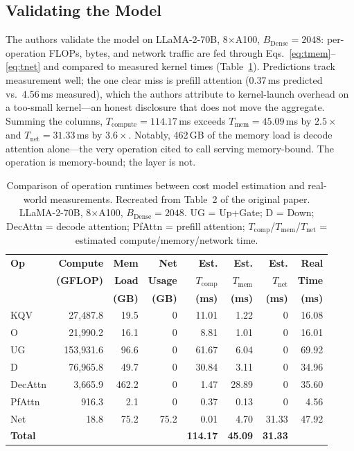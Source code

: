 \documentclass[manuscript,review]{acmart}
\newcommand{\Bdense}{B_{\mathrm{Dense}}}
\begin{document}
\subsection{Validating the Model}
\label{sec:validation}

The authors validate the model on LLaMA-2-70B, 8$\times$A100, $\Bdense = 2048$: per-operation FLOPs, bytes, 
and network traffic are fed through Eqs.~\ref{eq:tmem}--\ref{eq:tnet} and compared to measured kernel times 
(Table~\ref{tab:validation}). Predictions track measurement well; the one clear miss is prefill attention 
(0.37\,ms predicted vs.\ 4.56\,ms measured), which the authors attribute to kernel-launch overhead on a 
too-small kernel---an honest disclosure that does not move the aggregate. Summing the columns, 
$T_{\mathrm{compute}} = 114.17$\,ms exceeds $T_{\mathrm{mem}} = 45.09$\,ms by $2.5\times$ and $T_{\mathrm{net}} = 31.33$\,ms by 
$3.6\times$. Notably, 462\,GB of the memory load is decode attention alone---the very operation cited to call 
serving memory-bound. The operation is memory-bound; the layer is not.
\begin{table}[t]
\centering
\caption{Comparison of operation runtimes between cost model estimation and real-world measurements. 
Recreated from Table~2 of the original paper. LLaMA-2-70B, 8$\times$A100, $\Bdense = 2048$. UG = Up+Gate; 
D = Down; DecAttn = decode attention; PfAttn = prefill attention; $T_{\mathrm{comp}}$/$T_{\mathrm{mem}}$/$T_{\mathrm{net}}$ = estimated compute/memory/network time.}
\label{tab:validation}
\small
\setlength{\tabcolsep}{4pt}
\begin{tabular}{lrrrrrrr}
\toprule
\textbf{Op} & \textbf{Compute} & \textbf{Mem} & \textbf{Net} &
\textbf{Est.} & \textbf{Est.} & \textbf{Est.} & \textbf{Real} \\
 & \textbf{(GFLOP)} & \textbf{Load} & \textbf{Usage} &
$T_{\mathrm{comp}}$ & $T_{\mathrm{mem}}$ & $T_{\mathrm{net}}$ & \textbf{Time} \\
 & & \textbf{(GB)} & \textbf{(GB)} & \textbf{(ms)} & \textbf{(ms)} &
\textbf{(ms)} & \textbf{(ms)} \\
\midrule
KQV     & 27{,}487.8  & 19.5  & 0    & 11.01 & 1.22  & 0     & 16.08 \\
O       & 21{,}990.2  & 16.1  & 0    & 8.81  & 1.01  & 0     & 16.01 \\
UG      & 153{,}931.6 & 96.6  & 0    & 61.67 & 6.04  & 0     & 69.92 \\
D       & 76{,}965.8  & 49.7  & 0    & 30.84 & 3.11  & 0     & 34.96 \\
DecAttn & 3{,}665.9   & 462.2 & 0    & 1.47  & 28.89 & 0     & 35.60 \\
PfAttn  & 916.3       & 2.1   & 0    & 0.37  & 0.13  & 0     & 4.56  \\
Net     & 18.8        & 75.2  & 75.2 & 0.01  & 4.70  & 31.33 & 47.92 \\
\midrule
\textbf{Total} & & & & \textbf{114.17} & \textbf{45.09} & \textbf{31.33} & \\
\bottomrule
\end{tabular}
\end{table}
\end{document}
